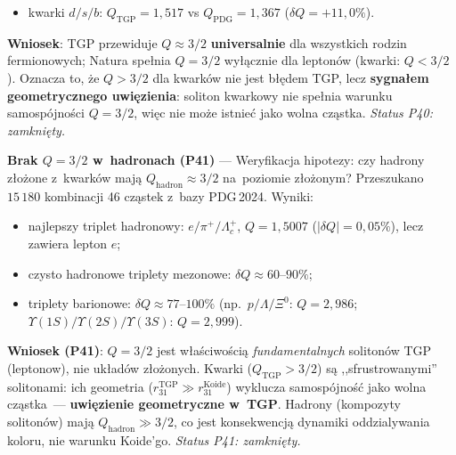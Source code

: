 \begin{problem}
\begin{description}[leftmargin=2em, labelindent=0pt]
\begin{itemize}[nosep]
          ($\delta Q = +29{,}5\%$);
    \item kwarki $d/s/b$: $Q_\mathrm{TGP} = 1{,}517$ vs $Q_\mathrm{PDG} = 1{,}367$
          ($\delta Q = +11{,}0\%$).
  \end{itemize}
  \textbf{Wniosek}: TGP przewiduje $Q \approx 3/2$ \textbf{universalnie}
  dla wszystkich rodzin fermionowych; Natura spe\l{}nia $Q = 3/2$
  wy\l{}\k{a}cznie dla leptonów (kwarki: $Q < 3/2$).
  Oznacza to, \.ze $Q > 3/2$ dla kwark\'ow nie jest b\l{}\k{e}dem TGP,
  lecz \textbf{sygna\l{}em geometrycznego uwi\k{e}zienia}: soliton kwarkowy
  nie spe\l{}nia warunku samosp\'ojno\'sci $Q = 3/2$, wi\k{e}c nie mo\.ze
  istnie\'c jako wolna cz\k{a}stka.
  \textit{Status P40: zamkni\k{e}ty.}

  \textbf{Brak $Q = 3/2$ w~hadronach (P41)} ---
  Weryfikacja hipotezy: czy hadrony z\l{}o\.zone z~kwark\'ow maj\k{a}
  $Q_\mathrm{hadron} \approx 3/2$ na~poziomie z\l{}o\.zonym?
  Przeszukano $15\,180$ kombinacji 46 cz\k{a}stek z~bazy PDG\,2024.
  Wyniki:
  \begin{itemize}[nosep]
    \item najlepszy triplet hadronowy: $e/\pi^+/\Lambda_c^+$,
          $Q = 1{,}5007$ ($|\delta Q| = 0{,}05\%$), lecz zawiera lepton $e$;
    \item czysto hadronowe triplety mezonowe: $\delta Q \approx 60$--$90\%$;
    \item triplety barionowe: $\delta Q \approx 77$--$100\%$
          (np.\ $p/\Lambda/\Xi^0$: $Q = 2{,}986$;
          $\Upsilon(1S)/\Upsilon(2S)/\Upsilon(3S)$: $Q = 2{,}999$).
  \end{itemize}
  \textbf{Wniosek (P41)}: $Q = 3/2$ jest w\l{}a\'sciwo\'sci\k{a}
  \emph{fundamentalnych} soliton\'ow TGP (leptonow), nie uk\l{}ad\'ow
  z\l{}o\.zonych.
  Kwarki ($Q_\mathrm{TGP} > 3/2$) s\k{a} ,,sfrustrowanymi''
  solitonami: ich geometria ($r_{31}^\mathrm{TGP} \gg r_{31}^\mathrm{Koide}$)
  wyklucza samosp\'ojno\'s\'c jako wolna cz\k{a}stka~---
  \textbf{uwi\k{e}zienie geometryczne w~TGP}.
  Hadrony (kompozyty soliton\'ow) maj\k{a} $Q_\mathrm{hadron} \gg 3/2$,
  co jest konsekwencj\k{a} dynamiki oddzialywania koloru, nie warunku
  Koide'go.
  \textit{Status P41: zamkni\k{e}ty.}


\end{description}
\end{problem}

